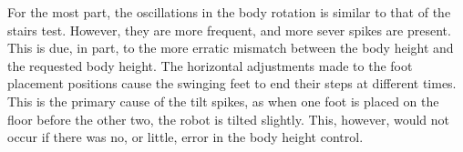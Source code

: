     For the most part, the oscillations in the body rotation is similar to that of the stairs test. However, they are more frequent, and more sever spikes are present. This is due, in part, to the more erratic mismatch between the body height and the requested body height. The horizontal adjustments made to the foot placement positions cause the swinging feet to end their steps at different times. This is the primary cause of the tilt spikes, as when one foot is placed on the floor before the other two, the robot is tilted slightly. This, however, would not occur if there was no, or little, error in the body height control.



